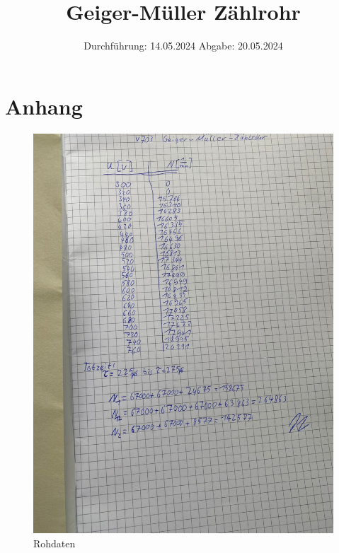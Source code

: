 

\subject{V703}
\title{Geiger-Müller Zählrohr}
\date{%
  Durchführung: 14.05.2024
  \hspace{3em}
  Abgabe: 20.05.2024
}



\maketitle
\thispagestyle{empty}
\tableofcontents
\newpage







\newpage
\printbibliography{}
\newpage


\section{Anhang}
\begin{figure}[H]
  \includegraphics[width=\textwidth]{Bilder/rohdaten.jpg}
  \caption{Rohdaten}
\end{figure}


